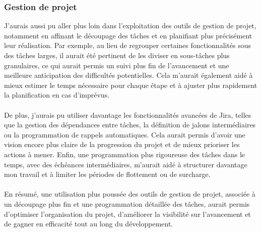 \documentclass[12pt]{article}
\begin{document}
\subsubsection{Gestion de projet}
J’aurais aussi pu aller plus loin dans l’exploitation des outils de gestion de projet, notamment en affinant le découpage des tâches et en planifiant plus précisément leur réalisation. Par exemple, au lieu de regrouper certaines fonctionnalités sous des tâches larges, il aurait été pertinent de les diviser en sous-tâches plus granulaires, ce qui aurait permis un suivi plus fin de l’avancement et une meilleure anticipation des difficultés potentielles. Cela m’aurait également aidé à mieux estimer le temps nécessaire pour chaque étape et à ajuster plus rapidement la planification en cas d’imprévus.
\\\\
De plus, j’aurais pu utiliser davantage les fonctionnalités avancées de Jira, telles que la gestion des dépendances entre tâches, la définition de jalons intermédiaires ou la programmation de rappels automatiques. Cela aurait permis d’avoir une vision encore plus claire de la progression du projet et de mieux prioriser les actions à mener. Enfin, une programmation plus rigoureuse des tâches dans le temps, avec des échéances intermédiaires, m’aurait aidé à structurer davantage mon travail et à limiter les périodes de flottement ou de surcharge.
\\\\
En résumé, une utilisation plus poussée des outils de gestion de projet, associée à un découpage plus fin et une programmation détaillée des tâches, aurait permis d’optimiser l’organisation du projet, d’améliorer la visibilité sur l’avancement et de gagner en efficacité tout au long du développement.
\end{document}
